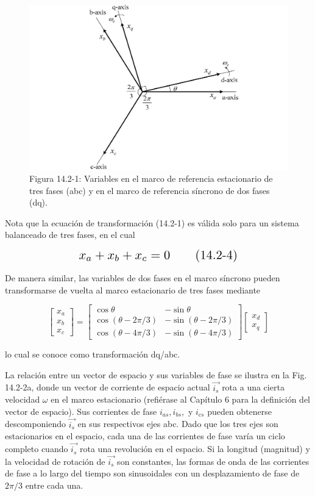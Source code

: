 \documentclass[letterpaper,12pt]{article} %
\begin{document}
\begin{figure}[ht]
    \centering
    \includegraphics[width=\textwidth]{graficos/img01.jpg} 
    \caption{Figura 14.2-1: Variables en el marco de referencia estacionario de tres fases (abc) y en el marco de referencia síncrono de dos fases (dq).}
    \label{fig:14.2-1}
\end{figure}
\FloatBarrier

Nota que la ecuación de transformación (14.2-1) es válida solo para un sistema balanceado de tres fases, en el cual

\[
    \scalebox{1.5}{$x_a + x_b + x_c = 0 \tag{14.2-4}$}
\]

De manera similar, las variables de dos fases en el marco síncrono pueden transformarse de vuelta al marco estacionario de tres fases mediante

\[
\begin{bmatrix}
x_a \\
x_b \\
x_c 
\end{bmatrix} 
= 
\begin{bmatrix}
\cos \theta & -\sin \theta \\
\cos(\theta - 2\pi/3) & -\sin(\theta - 2\pi/3) \\
\cos(\theta - 4\pi/3) & -\sin(\theta - 4\pi/3)
\end{bmatrix}
\begin{bmatrix}
x_d \\
x_q 
\end{bmatrix} \tag{14.2-5}
\]

lo cual se conoce como transformación dq/abc.

La relación entre un vector de espacio y sus variables de fase se ilustra en la Fig. 14.2-2a, donde un vector de corriente de espacio actual \( \vec{i_s} \) rota a una cierta velocidad \( \omega \) en el marco estacionario (refiérase al Capítulo 6 para la definición del vector de espacio). Sus corrientes de fase \( i_{as}, i_{bs}, \) y \( i_{cs} \) pueden obtenerse descomponiendo \( \vec{i_s} \) en sus respectivos ejes abc. Dado que los tres ejes son estacionarios en el espacio, cada una de las corrientes de fase varía un ciclo completo cuando \( \vec{i_s} \) rota una revolución en el espacio. Si la longitud (magnitud) y la velocidad de rotación de \( \vec{i_s} \) son constantes, las formas de onda de las corrientes de fase a lo largo del tiempo son sinusoidales con un desplazamiento de fase de \( 2\pi/3 \) entre cada una.
\end{document}
